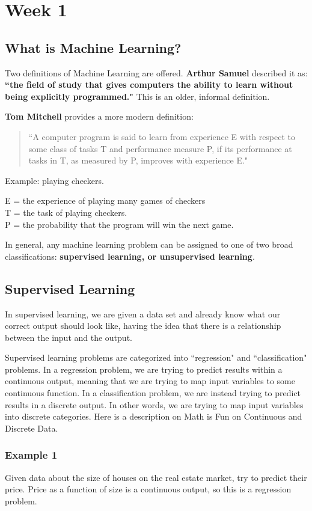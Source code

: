 \chapter{Week 1}
\section{What is Machine Learning?}
Two definitions of Machine Learning are offered. {\bf Arthur Samuel} described it as: {\bf ``the field of study that gives computers the ability to learn without being explicitly programmed."} This is an older, informal definition.

{\bf Tom Mitchell} provides a more modern definition: 
\begin{quote}
``A computer program is said to learn from experience E with respect to some class of tasks T and performance measure P, if its performance at tasks in T, as measured by P, improves with experience E."
\end{quote}
Example: playing checkers.

E = the experience of playing many games of checkers \\[1pt]
T = the task of playing checkers.\\[1pt]
P = the probability that the program will win the next game.

In general, any machine learning problem can be assigned to one of two broad classifications: {\bf supervised learning, or unsupervised learning}.

\section{Supervised Learning}
In supervised learning, we are given a data set and already know what our correct output should look like, having the idea that there is a relationship between the input and the output.

Supervised learning problems are categorized into ``regression" and ``classification" problems. In a regression problem, we are trying to predict results within a continuous output, meaning that we are trying to map input variables to some continuous function. In a classification problem, we are instead trying to predict results in a discrete output. In other words, we are trying to map input variables into discrete categories. Here is a description on Math is Fun on Continuous and Discrete Data.
\subsection{Example 1}
Given data about the size of houses on the real estate market, try to predict their price. Price as a function of size is a continuous output, so this is a regression problem.

